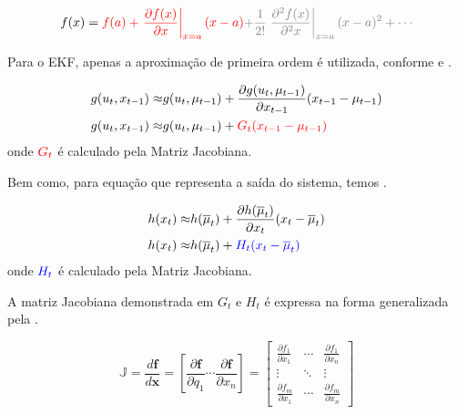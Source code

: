 \begin{equation}
    \label{eq:taylor1}
    f(x) = \textcolor{red}{f(a) + \left. \frac{\partial f(x)}{\partial x} \right\vert_{x=a}(x-a)}
    \textcolor{gray}{+\frac{1}{2!}\left. \frac{\partial^2 f(x)}{\partial^2 x} \right\vert_{x=a}(x-a)^2 + \cdots}
\end{equation}

    Para o EKF, apenas a aproximação de primeira ordem é utilizada, conforme  e .

\begin{equation}
    \label{eq:taylor2}
    \begin{split}
        g(u_t, x_{t-1}) \approx & g(u_t, \mu_{t-1}) + \frac{\partial g(u_t, \mu_{t-1}) }{\partial x_{t-1}}(x_{t-1}-\mu_{t-1}) \\
        g(u_t, x_{t-1}) \approx & g(u_t, \mu_{t-1}) + \color{red}{G_t}(x_{t-1}-\mu_{t-1})
    \end{split}
\end{equation}
onde $\color{red}G_t$ é calculado pela Matriz Jacobiana.

Bem como, para equação que representa a saída do sistema, temos .

\begin{equation}
    \label{eq:taylor4}
    \begin{split}
        h(x_t) \approx & h(\overline{\mu}_t) + \frac{\partial h(\overline{\mu}_t) }{\partial x_{t}}(x_{t}-\overline{\mu}_{t}) \\
        h(x_t) \approx & h(\overline{\mu}_t) + \color{blue}{H_t}(x_{t}-\overline{\mu}_{t})
    \end{split}
\end{equation}
onde $\color{blue}H_t$ é calculado pela Matriz Jacobiana.

A matriz Jacobiana demonstrada em $G_t$ e $H_t$ é expressa na forma generalizada pela .

\begin{equation}
    \label{eq:taylor5}
    \mathbb{J}
    =
    \frac{d \mathbf{f}}{d \mathbf{x}}
    =
    \left[ \frac{\partial \mathbf{f}}{\partial q_1}
        \cdots \frac{\partial \mathbf{f}}{\partial x_n} \right]
    =
    \begin{bmatrix}
        \frac{\partial f_1}{\partial x_1} & \cdots &
        \frac{\partial f_1}{\partial x_n}                   \\
        \vdots                            & \ddots & \vdots \\
        \frac{\partial f_m}{\partial x_1} & \cdots &
        \frac{\partial f_m}{\partial x_n}
    \end{bmatrix}
\end{equation}

